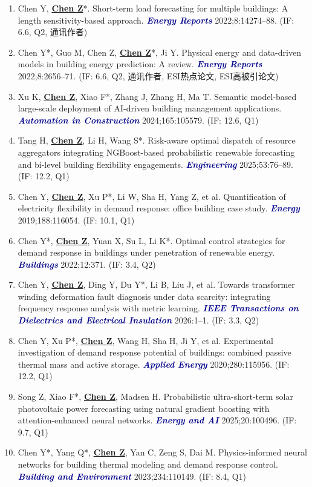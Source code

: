 \documentclass[11pt,a4paper]{article}
\newcommand{\me}[1]{\underline{\textbf{#1}}}
\newcommand{\journal}[1]{\textcolor{darkblue}{\textbf{\textit{#1}}}}
\begin{document}
\begin{enumerate}
\item Chen Y, \me{Chen Z}*. Short-term load forecasting for multiple buildings: A length sensitivity-based approach. \journal{Energy Reports} 2022;8:14274--88. (IF: 6.6, Q2, 通讯作者)
\item Chen Y*, Guo M, Chen Z, \me{Chen Z}*, Ji Y. Physical energy and data-driven models in building energy prediction: A review. \journal{Energy Reports} 2022;8:2656--71. (IF: 6.6, Q2, 通讯作者, ESI热点论文, ESI高被引论文)
\item Xu K, \me{Chen Z}, Xiao F*, Zhang J, Zhang H, Ma T. Semantic model-based large-scale deployment of AI-driven building management applications. \journal{Automation in Construction} 2024;165:105579. (IF: 12.6, Q1)
\item Tang H, \me{Chen Z}, Li H, Wang S*. Risk-aware optimal dispatch of resource aggregators integrating NGBoost-based probabilistic renewable forecasting and bi-level building flexibility engagements. \journal{Engineering} 2025;53:76--89. (IF: 12.2, Q1)
\item Chen Y, \me{Chen Z}, Xu P*, Li W, Sha H, Yang Z, et al. Quantification of electricity flexibility in demand response: office building case study. \journal{Energy} 2019;188:116054. (IF: 10.1, Q1)
\item Chen Y*, \me{Chen Z}, Yuan X, Su L, Li K*. Optimal control strategies for demand response in buildings under penetration of renewable energy. \journal{Buildings} 2022;12:371. (IF: 3.4, Q2)
\item Chen Y, \me{Chen Z}, Ding Y, Du Y*, Li B, Liu J, et al. Towards transformer winding deformation fault diagnosis under data scarcity: integrating frequency response analysis with metric learning. \journal{IEEE Transactions on Dielectrics and Electrical Insulation} 2026:1--1. (IF: 3.3, Q2)
\item Chen Y, Xu P*, \me{Chen Z}, Wang H, Sha H, Ji Y, et al. Experimental investigation of demand response potential of buildings: combined passive thermal mass and active storage. \journal{Applied Energy} 2020;280:115956. (IF: 12.2, Q1)
\item Song Z, Xiao F*, \me{Chen Z}, Madsen H. Probabilistic ultra-short-term solar photovoltaic power forecasting using natural gradient boosting with attention-enhanced neural networks. \journal{Energy and AI} 2025;20:100496. (IF: 9.7, Q1)
\item Chen Y*, Yang Q*, \me{Chen Z}, Yan C, Zeng S, Dai M. Physics-informed neural networks for building thermal modeling and demand response control. \journal{Building and Environment} 2023;234:110149. (IF: 8.4, Q1)

\end{enumerate}
\end{document}

